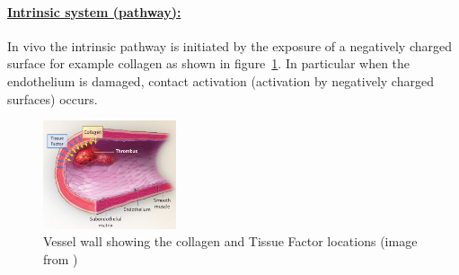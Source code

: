 \documentclass[%
 nofootinbib,
 amsmath,amssymb,
 aps,
 pra,
]{revtex4-1}
\begin{document}
\paragraph{\underline{Intrinsic system (pathway):}}
In vivo the intrinsic pathway is initiated by the exposure of a negatively charged surface for example collagen as shown in figure~\ref{sec:fur}. In particular when the endothelium is damaged, contact activation (activation by negatively charged surfaces) occurs.\\ 
\begin{figure}[h]
\includegraphics[width=0.35\textwidth]{Figures/Furie.png}
\caption{\label{sec:fur} Vessel wall showing the collagen and Tissue Factor locations (image from \citet{Furie:2008})}
\end{figure}
 
\end{document}

